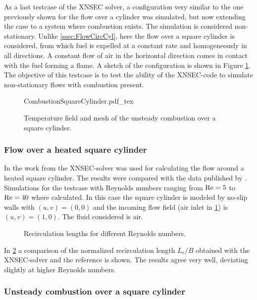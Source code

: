 \FloatBarrier
As a last testcase of the XNSEC solver, a configuration very similar to the one previously shown for the flow over a cylinder was simulated, but now extending the case to a system where combustion exists. The simulation is considered non-stationary. Unlike \cref{ssec:FlowCircCyl}, here the flow over a square cylinder is considered, from which fuel is expelled at a constant rate and homogeneously in all directions. A constant flow of air in the horizontal direction comes in contact with the fuel forming a flame.  A sketch of the configuration is shown in Figure \cref{fig:CombustionSquareCylinder}. The objective of this testcase is to test the ability of the XNSEC-code to simulate non-stationary flows with combustion present. 
\begin{figure}[h]
	\begin{center}
		\def\svgwidth{0.8\textwidth}
		{CombustionSquareCylinder.pdf_tex}
		\caption{Temperature field and mesh of the unsteady combustion over a square cylinder.}
		\label{fig:CombustionSquareCylinder}
	\end{center}
\end{figure}


\subsubsection{Flow over a heated square cylinder}
In the work from \cite{miaoHighOrderSimulationLowMachFlows2022} the XNSEC-solver was used for calculating the flow around a heated square cylinder. The results were compared with the data published by \cite{sharmaHEATFLUIDFLOW2004}. Simulations for the testcase with Reynolds numbers ranging from $\text{Re} = 5$ to $\text{Re} = 40$ where calculated. In this case the square cylinder is modeled by no-slip walls with $(u,v) = (0,0)$ and the incoming flow field (air inlet in \cref{fig:CombustionSquareCylinder}) is $(u,v) = (1,0)$. The fluid considered is air. 
\begin{figure}[h!]
	\centering
	\caption{Recirculation lengths for different Reynolds numbers.}
	\label{fig:RecirculationLength}
\end{figure}
In \cref{fig:RecirculationLength} a comparison of the normalized recirculation length $L_r/B$ obtained with the XNSEC-solver and the reference is shown. The results agree very well, deviating slightly at higher Reynolds numbers.

\subsubsection{Unsteady combustion over a square cylinder}

